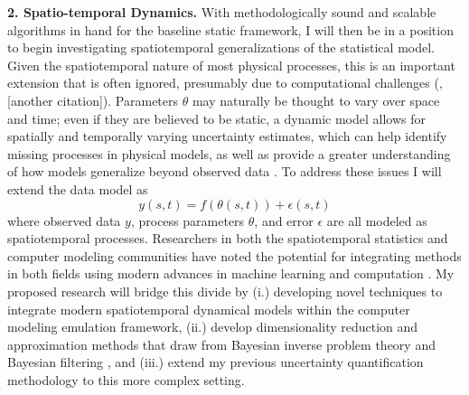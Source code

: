 \documentclass[12pt]{article}
\begin{document}
 \textbf{2. Spatio-temporal Dynamics.}
With methodologically sound and scalable algorithms in hand for the baseline static framework, I will then be in a position to begin investigating spatiotemporal generalizations of the statistical model. Given the spatiotemporal nature of most physical processes, this is an important extension that is often ignored, presumably due to computational challenges (\cite{Fer2}, [another citation]). Parameters $\theta$ may naturally be thought to vary over space
and time; even if they are believed to be static, a dynamic model allows for spatially and temporally varying uncertainty estimates, which can help identify 
missing processes in physical models, as well as provide a greater understanding of how models generalize beyond observed data \cite{Fer2, Dietze}. To address these issues I will extend the data model as 
  \[y(s, t) = f(\theta(s, t)) + \epsilon(s, t)\]
 where observed data $y$, process parameters $\theta$, and error $\epsilon$ are all modeled as spatiotemporal processes. Researchers in both the spatiotemporal statistics and computer modeling communities
have noted the potential for integrating methods in both fields using modern advances in machine learning and computation \cite{Wikle, Baker}. My proposed research will bridge this divide by (i.) developing novel techniques to integrate modern spatiotemporal dynamical models \cite{Wikle, Hefley}
within the computer modeling emulation framework, (ii.) develop dimensionality reduction and approximation methods that draw from Bayesian inverse problem 
theory \cite{Kugler} and Bayesian filtering \cite{Sarkka}, and (iii.) extend my previous uncertainty quantification methodology to this more complex setting. 
 
\end{document}
